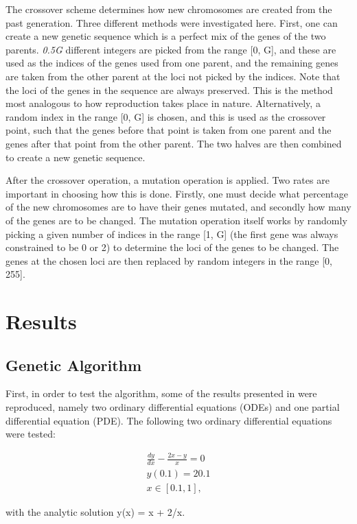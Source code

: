 \documentclass[multicolumn, 12pt]{extarticle}
\begin{document}
The crossover scheme determines how new chromosomes are created from the past generation. Three different methods were investigated here. First, one can create a new genetic sequence which is a perfect mix of the genes of the two parents. \textit{0.5G} different integers are picked from the range [0, G], and these are used as the indices of the genes used from one parent, and the remaining genes are taken from the other parent at the loci not picked by the indices. Note that the loci of the genes in the sequence are always preserved. This is the method most analogous to how reproduction takes place in nature. Alternatively, a random index in the range [0, G] is chosen, and this is used as the crossover point, such that the genes before that point is taken from one parent and the genes after that point from the other parent. The two halves are then combined to create a new genetic sequence.

After the crossover operation, a mutation operation is applied. Two rates are important in choosing how this is done. Firstly, one must decide what percentage of the new chromosomes are to have their genes mutated, and secondly how many of the genes are to be changed. The mutation operation itself works by randomly picking a given number of indices in the range [1, G] (the first gene was always constrained to be 0 or 2) to determine the loci of the genes to be changed. The genes at the chosen loci are then replaced by random integers in the range [0, 255].

\section{Results}

\subsection{Genetic Algorithm}
First, in order to test the algorithm, some of the results presented in \cite{Lagaris} were reproduced, namely two ordinary differential equations (ODEs) and one partial differential equation (PDE). The following two ordinary differential equations were tested: 

\begin{align*}
	\frac{dy}{dx}  - \frac{2x - y}{x} = 0 \\
	y(0.1) = 20.1  \\
	x \in [0.1, 1],
\end{align*}

with the analytic solution y(x) = x + 2/x. 
\end{document}
